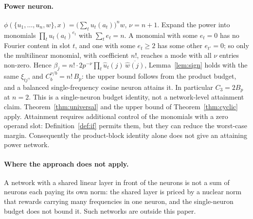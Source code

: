 \paragraph{Power neuron.} $\phi(\{u_1,\dots,u_n,w\},x)=\big(\sum_tu_t(a_t)\big)^n w$, $\nu=n+1$. Expand the power into monomials $\prod_tu_t(a_t)^{e_t}$ with $\sum_te_t=n$. A monomial with some $e_t=0$ has no Fourier content in slot $t$, and one with some $e_t\ge2$ has some other $e_{t'}=0$; so only the multilinear monomial, with coefficient $n!$, reaches a mode with all $\nu$ entries non-zero. Hence $\beta_j=n!\cdot2p^{-\nu}\prod_t\hat u_t(j)\,\overline{\hat w(j)}$, Lemma~\ref{lem:sign} holds with the same $\xi_{tj}$, and $C_b^{\nu/b}=n!\,B_p$: the upper bound follows from the product budget, and a balanced single-frequency cosine neuron attains it. In particular $C_3=2B_p$ at $n=2$. This is a single-neuron budget identity, not a network-level attainment claim. Theorem~\ref{thm:universal} and the upper bound of Theorem~\ref{thm:cyclic} apply. Attainment requires additional control of the monomials with a zero operand slot: Definition~\ref{def:if} permits them, but they can reduce the worst-case margin. Consequently the product-block identity alone does not give an attaining power network.


\paragraph{Where the approach does not apply.} A network with a shared linear layer in front of the neurons is not a sum of neurons each paying its own norm: the shared layer is priced by a nuclear norm that rewards carrying many frequencies in one neuron, and the single-neuron budget does not bound it. Such networks are outside this paper.

